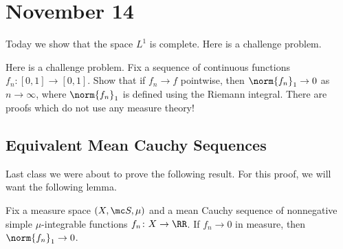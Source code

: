 \documentclass[../notes.tex]{subfiles}
\begin{document}
\section{November 14}

Today we show that the space $L^1$ is complete. Here is a challenge problem.
\begin{remark}
	Here is a challenge problem. Fix a sequence of continuous functions $f_n\colon[0,1]\to[0,1]$. Show that if $f_n\to f$ pointwise, then $\norm{f_n}_1\to0$ as $n\to\infty$, where $\norm{f_n}_1$ is defined using the Riemann integral. There are proofs which do not use any measure theory!
\end{remark}

\subsection{Equivalent Mean Cauchy Sequences}
Last class we were about to prove the following result.
\intisdefinedprop*
\noindent For this proof, we will want the following lemma.
\begin{lemma} \label{lem:int-defined-zero}
	Fix a measure space $(X,\mc S,\mu)$ and a mean Cauchy sequence of nonnegative simple $\mu$-integrable functions $f_n\colon X\to\RR$. If $f_n\to0$ in measure, then $\norm{f_n}_1\to0$.
\end{lemma}
\end{document}
